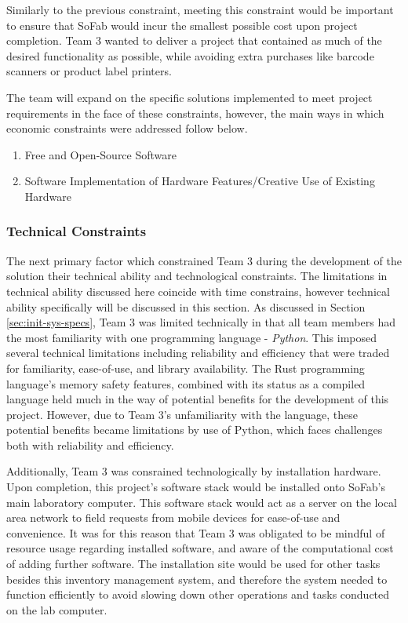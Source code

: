 \documentclass{article}
\begin{document}
Similarly to the previous constraint, meeting this constraint would be important to ensure that SoFab would incur the smallest possible
cost upon project completion. Team 3 wanted to deliver a project that contained as much of the desired functionality as possible, while
avoiding extra purchases like barcode scanners or product label printers. 

The team will expand on the specific solutions implemented to meet project requirements in the face of these constraints, however, the 
main ways in which economic constraints were addressed follow below. 

\begin{enumerate}
    \item Free and Open-Source Software
    \item Software Implementation of Hardware Features\slash Creative Use of Existing Hardware
\end{enumerate}

\subsubsection{Technical Constraints}
The next primary factor which constrained Team 3 during the development of the solution their technical ability and technological 
constraints. The limitations in technical ability discussed here coincide with time constrains, however technical ability specifically 
will be discussed in this section. As discussed in Section \ref{sec:init-sys-specs}, Team 3 was limited technically in that all team 
members had the most familiarity with one programming language - \textit{Python}. This imposed several technical limitations including 
reliability and efficiency that were traded for familiarity, ease-of-use, and library availability. The Rust programming language's 
memory safety features, combined with its status as a compiled language held much in the way of potential benefits for the development 
of this project. However, due to Team 3's unfamiliarity with the language, these potential benefits became limitations by use of Python, 
which faces challenges both with reliability and efficiency. 

Additionally, Team 3 was consrained technologically by installation hardware. Upon completion, this project's software stack would 
be installed onto SoFab's main laboratory computer. This software stack would act as a server on the local area network to field requests
from mobile devices for ease-of-use and convenience. It was for this reason that Team 3 was obligated to be mindful of resource usage 
regarding installed software, and aware of the computational cost of adding further software. The installation site would be used for 
other tasks besides this inventory management system, and therefore the system needed to function efficiently to avoid slowing down 
other operations and tasks conducted on the lab computer. 
\end{document}
